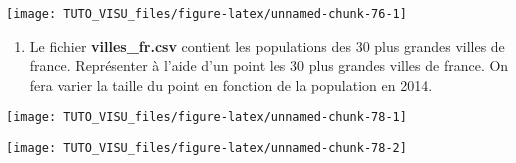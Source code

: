 \documentclass[]{book}
\newenvironment{Shaded}{\begin{snugshade}}{\end{snugshade}}
\newcommand{\DataTypeTok}[1]{\textcolor[rgb]{0.13,0.29,0.53}{#1}}
\newcommand{\DecValTok}[1]{\textcolor[rgb]{0.00,0.00,0.81}{#1}}
\newcommand{\KeywordTok}[1]{\textcolor[rgb]{0.13,0.29,0.53}{\textbf{#1}}}
\newcommand{\NormalTok}[1]{#1}
\newcommand{\OperatorTok}[1]{\textcolor[rgb]{0.81,0.36,0.00}{\textbf{#1}}}
\newcommand{\StringTok}[1]{\textcolor[rgb]{0.31,0.60,0.02}{#1}}
\providecommand{\tightlist}{%
  \setlength{\itemsep}{0pt}\setlength{\parskip}{0pt}}
\theoremstyle{definition}
\theoremstyle{definition}
\theoremstyle{definition}
\theoremstyle{remark}
\begin{document}
\begin{center}\texttt{[image: TUTO\_VISU\_files/figure-latex/unnamed-chunk-76-1]} \end{center}

\begin{enumerate}
\def\labelenumi{\arabic{enumi}.}
\setcounter{enumi}{1}
\tightlist
\item
  Le fichier \textbf{villes\_fr.csv} contient les populations des 30 plus grandes villes de france. Représenter à l'aide d'un point les 30 plus grandes villes de france. On fera varier la taille du point en fonction de la population en 2014.
\end{enumerate}

\begin{center}\texttt{[image: TUTO\_VISU\_files/figure-latex/unnamed-chunk-78-1]} \end{center}

\begin{center}\texttt{[image: TUTO\_VISU\_files/figure-latex/unnamed-chunk-78-2]} \end{center}

\begin{Shaded}
\end{Shaded}
\end{document}
